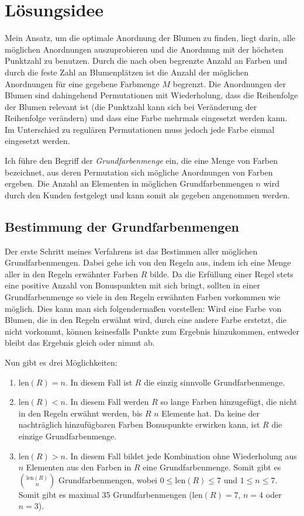 \documentclass[a4paper,10pt,ngerman]{scrartcl}
\title{\Aufgabe}
\author{\Name\\Einsendenummer: \Einsendenummer}
\date{\today}
\begin{document}
\maketitle
\tableofcontents

\section{Lösungsidee}
Mein Ansatz, um die optimale Anordnung der Blumen zu finden, liegt darin, alle möglichen Anordnungen auszuprobieren und die Anordnung mit der höchsten Punktzahl zu benutzen.
Durch die nach oben begrenzte Anzahl an Farben und durch die feste Zahl an Blumenplätzen ist die Anzahl der möglichen Anordnungen für eine gegebene Farbmenge $M$ begrenzt.
Die Anordnungen der Blumen sind dahingehend Permutationen mit Wiederholung, dass die Reihenfolge der Blumen relevant ist (die Punktzahl kann sich bei Veränderung der Reihenfolge verändern) und dass eine Farbe mehrmals eingesetzt werden kann.
Im Unterschied zu regulären Permutationen muss jedoch jede Farbe einmal eingesetzt werden.

Ich führe den Begriff der \textit{Grundfarbenmenge} ein, die eine Menge von Farben bezeichnet, aus deren Permutation sich mögliche Anordnungen von Farben ergeben.
Die Anzahl an Elementen in möglichen Grundfarbenmengen $n$ wird durch den Kunden festgelegt und kann somit als gegeben angenommen werden.

\subsection{Bestimmung der Grundfarbenmengen}
Der erste Schritt meines Verfahrens ist das Bestimmen aller möglichen Grundfarbenmengen.
Dabei gehe ich von den Regeln aus, indem ich eine Menge aller in den Regeln erwähnter Farben $R$ bilde.
Da die Erfüllung einer Regel stets eine positive Anzahl von Bonuspunkten mit sich bringt, sollten in einer Grundfarbenmenge so viele in den Regeln erwähnten Farben vorkommen wie möglich.
Dies kann man sich folgendermaßen vorstellen: Wird eine Farbe von Blumen, die in den Regeln erwähnt wird, durch eine andere Farbe erstetzt, die nicht vorkommt, können keinesfalls Punkte zum Ergebnis hinzukommen, entweder bleibt das Ergebnis gleich oder nimmt ab.

Nun gibt es drei Möglichkeiten:
\begin{enumerate}
  \item $\textrm{len}(R) = n$. 
  In diesem Fall ist $R$ die einzig sinnvolle Grundfarbenmenge.
  \item $\textrm{len}(R) < n$. 
  In diesem Fall werden $R$ so lange Farben hinzugefügt, die nicht in den Regeln erwähnt werden, bis $R$ $n$ Elemente hat. 
  Da keine der nachträglich hinzufügbaren Farben Bonuspunkte erwirken kann, ist $R$ die einzige Grundfarbenmenge.
  \item $\textrm{len}(R) > n$. 
  In diesem Fall bildet jede Kombination ohne Wiederholung aus $n$ Elementen aus den Farben in $R$ eine Grundfarbenmenge.
  Somit gibt es $ \binom{\textrm{len}(R)}{n}$ Grundfarbenmengen, wobei $0 \le \textrm{len}(R) \le 7$ und $1 \le n \le 7$. 
  Somit gibt es maximal 35 Grundfarbenmengen ($\textrm{len}(R)=7$, $n=4$ oder $n=3$).
\end{enumerate}
\end{document}
